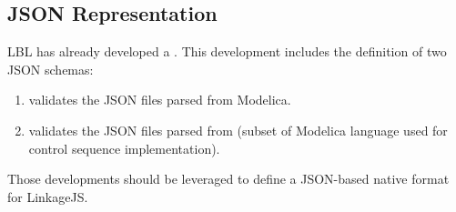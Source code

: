 \documentclass[letterpaper,10pt, openany,english]{sphinxmanual}
\begin{document}
\subsection{JSON Representation}
\label{\detokenize{requirements:json-representation}}
LBL has already developed a . This development includes the definition of two JSON schemas:
\begin{enumerate}
%
\item {} 
 validates the JSON files parsed from Modelica.

\item {} 
 validates the JSON files parsed from  (subset of Modelica language used for control sequence implementation).

\end{enumerate}

Those developments should be leveraged to define a JSON-based native format for LinkageJS.
\end{document}
